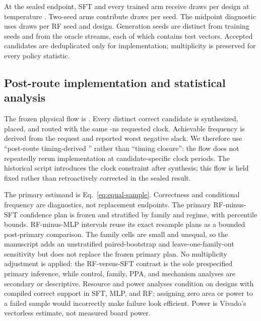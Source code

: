 At the sealed endpoint, SFT and every trained arm receive
 draws per design at temperature
.  Two-seed arms contribute
 draws per seed.  The midpoint
diagnostic uses  draws per RF seed
and design.  Generation seeds are distinct from training seeds and from the
 oracle streams, each of which contains
 test vectors.  Accepted candidates are
deduplicated only for implementation; multiplicity is preserved for every
policy statistic.

\subsection{Post-route implementation and statistical analysis}

The frozen physical flow is .  Every
distinct correct candidate is synthesized, placed, and routed with the same
-ns requested clock.  Achievable frequency is derived from
the request and reported worst negative slack.  We therefore use
``post-route timing-derived \fmax'' rather than ``timing closure'': the flow
does not repeatedly rerun implementation at candidate-specific clock periods.
The historical script introduces the clock constraint after synthesis; this
flow is held fixed rather than retroactively corrected in the sealed result.

The primary estimand is Eq.~\eqref{eq:equal-sample}.  Correctness and
conditional frequency are diagnostics, not replacement endpoints.  The
primary RF-minus-SFT confidence plan is frozen and stratified by family and
regime, with percentile bounds.  RF-minus-MLP intervals reuse its exact
resample plans as a bounded post-primary comparison.  The family cells are
small and unequal, so the manuscript adds an unstratified paired-bootstrap and
leave-one-family-out sensitivity but does not replace the frozen primary plan.
No multiplicity adjustment is applied: the RF-versus-SFT contrast is the sole
prespecified primary inference, while control, family, PPA, and mechanism
analyses are secondary or descriptive.  Resource and power analyses condition
on designs with compiled correct support in SFT, MLP, and RF; assigning zero
area or power to a failed sample would incorrectly make failure look efficient.
Power is Vivado's vectorless estimate, not measured board power.

